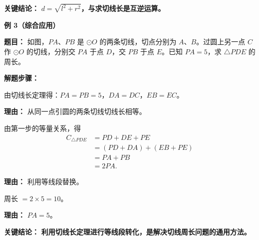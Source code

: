 \begin{examplebox}
	\textbf{\textcolor{CExample}{关键结论：}}
	\textbf{$d = \sqrt{l^{2} + r^{2}}$，与求切线长是互逆运算。}

	\medskip
	\textbf{\textcolor{CExample}{例 3（综合应用）}}

	\textbf{\textcolor{CExample}{题目：}}
	如图，$PA$、$PB$ 是 $\odot O$ 的两条切线，切点分别为 $A$、$B$。过圆上另一点 $C$ 作 $\odot O$ 的切线，分别交 $PA$ 于点 $D$，交 $PB$ 于点 $E$。已知 $PA=5$，求 $\triangle PDE$ 的周长。

	\textbf{\textcolor{CExample}{解题步骤：}}
	\begin{description}[style=nextline, leftmargin=2.8em, labelsep=0.5em, itemsep=0.45em]
		\item[\textbf{第一步（标记相等线段）：}] 由切线长定理得：$PA = PB = 5$，$DA = DC$，$EB = EC$。
			\par\textbf{理由：} 从同一点引圆的两条切线切线长相等。
		\item[\textbf{第二步（转化周长）：}] 由第一步的等量关系，得
			\[
				\begin{aligned}
					C_{\triangle PDE} &= PD + DE + PE \\
					&= (PD+DA)+(EB+PE) \\
					&= PA + PB \\
					&= 2PA .
			\end{aligned}
			\]
			\par\textbf{理由：} 利用等线段替换。
		\item[\textbf{第三步（代入数值）：}] 周长 $= 2 \times 5 = 10$。
			\par\textbf{理由：} $PA=5$。
	\end{description}

	\textbf{\textcolor{CExample}{关键结论：}}
	\textbf{利用切线长定理进行等线段转化，是解决切线周长问题的通用方法。}
\end{examplebox}
